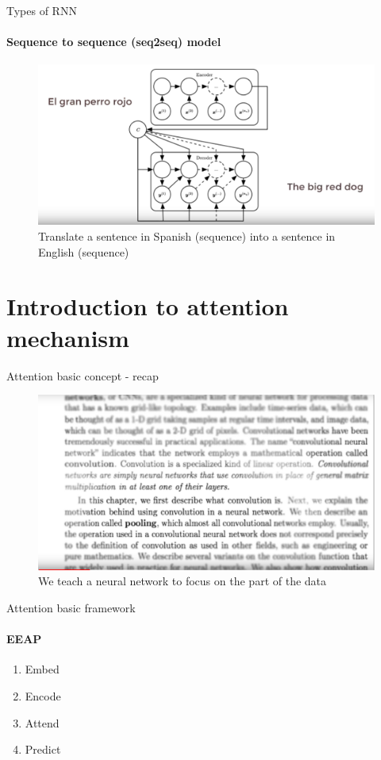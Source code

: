 \documentclass{beamer}
\begin{document}
\begin{frame}{Types of RNN}
\framesubtitle{Sequence to sequence (seq2seq) model}
\begin{figure}
    \centering
    \includegraphics[width = .6\textwidth]{images/seq-2-seq.png}
    \caption{Translate a sentence in Spanish (sequence) into a sentence in English (sequence)\footnotemark[7]
    }
\end{figure}{}
    
\end{frame}



\section{Introduction to attention mechanism}
\begin{frame}{Attention basic concept - recap}
\begin{figure}
    \includegraphics[width = .8\textwidth]{images/attention-intuition.png}
    \caption{We teach a neural network to focus on the part of the data\footnotemark[1]}
\end{figure}{}
    
\end{frame}


\begin{frame}{Attention basic framework}
\framesubtitle{EEAP}
\begin{center}
\begin{enumerate}
    \item Embed\pause
    
    \item Encode\pause
    
    \item Attend\pause
    
    \item Predict
\end{enumerate}{}
\end{center}{}    
\end{frame}
\end{document}
